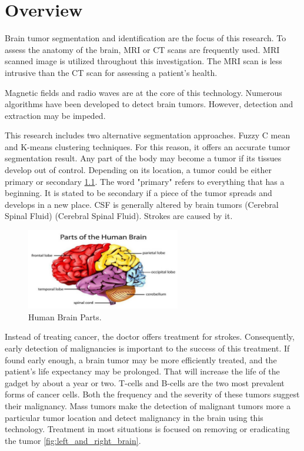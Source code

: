 \chapter{Overview}

Brain tumor segmentation and identification are the focus of this research. To assess the anatomy of the brain, MRI or CT scans are frequently used. MRI scanned image is utilized throughout this investigation. The MRI scan is less intrusive than the CT scan for assessing a patient's health.

Magnetic fields and radio waves are at the core of this technology. Numerous algorithms have been developed to detect brain tumors. However, detection and extraction may be impeded.

This research includes two alternative segmentation approaches. Fuzzy C mean and K-means clustering techniques. For this reason, it offers an accurate tumor segmentation result.
Any part of the body may become a tumor if its tissues develop out of control.
Depending on its location, a tumor could be either primary or secondary \ref{fig:human_brain_parts}.
The word "primary" refers to everything that has a beginning. It is stated to be
secondary if a piece of the tumor spreads and develops in a new place.
CSF is generally altered by brain tumors (Cerebral Spinal Fluid) (Cerebral Spinal
Fluid). Strokes are caused by it.

\begin{figure}
    \centering
    \includegraphics[width=0.60\textwidth]{Img/chap-03/human_brain_parts.jpg}
    \caption{Human Brain Parts.}
    \label{fig:human_brain_parts}
\end{figure}

Instead of treating cancer, the doctor offers treatment for strokes. Consequently,
early detection of malignancies is important to the success of this treatment.
If found early enough, a brain tumor may be more efficiently treated, and the
patient's life expectancy may be prolonged.
That will increase the life of the gadget by about a year or two.
T-cells and B-cells are the two most prevalent forms of cancer cells. Both the
frequency and the severity of these tumors suggest their malignancy. Mass tumors
make the detection of malignant tumors more a particular tumor location and detect
malignancy in the brain using this technology.
Treatment in most situations is focused on removing or eradicating the tumor \ref{fig:left_and_right_brain}.

